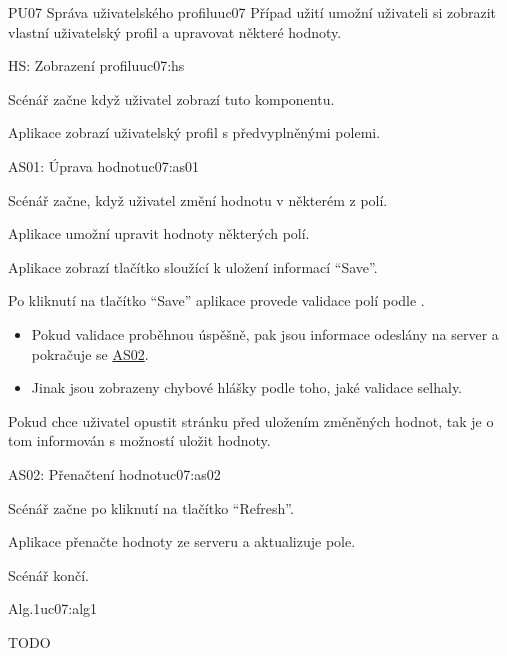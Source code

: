 \begin{usecase}{PU07 Správa uživatelského profilu}{uc07}
    Případ užití umožní uživateli si zobrazit vlastní uživatelský profil a upravovat některé hodnoty.

    \begin{scenario}{HS: Zobrazení profilu}{uc07:hs}
        \item Scénář začne když uživatel zobrazí tuto komponentu.
        \item Aplikace zobrazí uživatelský profil s předvyplněnými polemi.
    \end{scenario}

    \begin{scenario}{AS01: Úprava hodnot}{uc07:as01}
        \item Scénář začne, když uživatel změní hodnotu v některém z polí.
        \item Aplikace umožní upravit hodnoty některých polí.
        \item Aplikace zobrazí tlačítko sloužící k uložení informací \enquote{Save}.
        \item Po kliknutí na tlačítko \enquote{Save} aplikace provede validace polí podle .
        \begin{itemize}
            \item Pokud validace proběhnou úspěšně, pak jsou informace odeslány na server a pokračuje se \hyperref[uc07:as02]{AS02}.
            \item Jinak jsou zobrazeny chybové hlášky podle toho, jaké validace selhaly.
        \end{itemize}
        \item Pokud chce uživatel opustit stránku před uložením změněných hodnot, tak je o tom informován s možností uložit hodnoty.
    \end{scenario}

    \begin{scenario}{AS02: Přenačtení hodnot}{uc07:as02}
        \item Scénář začne po kliknutí na tlačítko \enquote{Refresh}.
        \item Aplikace přenačte hodnoty ze serveru a aktualizuje pole.
        \item Scénář končí.
    \end{scenario}

    \begin{scenario}{Alg.1}{uc07:alg1}
        \item TODO
    \end{scenario}
\end{usecase}